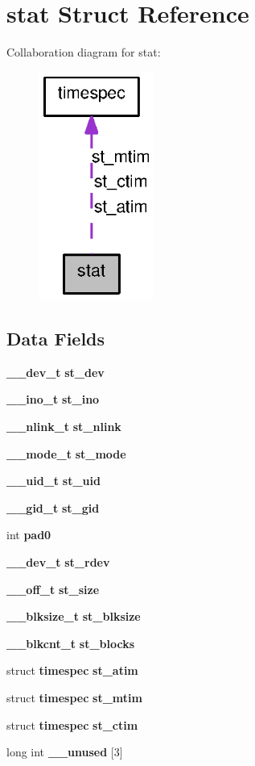 \section{stat Struct Reference}
\label{structstat}


Collaboration diagram for stat:
\nopagebreak
\begin{figure}[H]
\begin{center}
\leavevmode
\includegraphics[width=107pt]{structstat__coll__graph}
\end{center}
\end{figure}
\subsection*{Data Fields}
\begin{DoxyCompactItemize}
\item 
{\bf \_\-\_\-dev\_\-t} {\bf st\_\-dev}
\item 
{\bf \_\-\_\-ino\_\-t} {\bf st\_\-ino}
\item 
{\bf \_\-\_\-nlink\_\-t} {\bf st\_\-nlink}
\item 
{\bf \_\-\_\-mode\_\-t} {\bf st\_\-mode}
\item 
{\bf \_\-\_\-uid\_\-t} {\bf st\_\-uid}
\item 
{\bf \_\-\_\-gid\_\-t} {\bf st\_\-gid}
\item 
int {\bf pad0}
\item 
{\bf \_\-\_\-dev\_\-t} {\bf st\_\-rdev}
\item 
{\bf \_\-\_\-off\_\-t} {\bf st\_\-size}
\item 
{\bf \_\-\_\-blksize\_\-t} {\bf st\_\-blksize}
\item 
{\bf \_\-\_\-blkcnt\_\-t} {\bf st\_\-blocks}
\item 
struct {\bf timespec} {\bf st\_\-atim}
\item 
struct {\bf timespec} {\bf st\_\-mtim}
\item 
struct {\bf timespec} {\bf st\_\-ctim}
\item 
long int {\bf \_\-\_\-unused} [3]
\end{DoxyCompactItemize}



